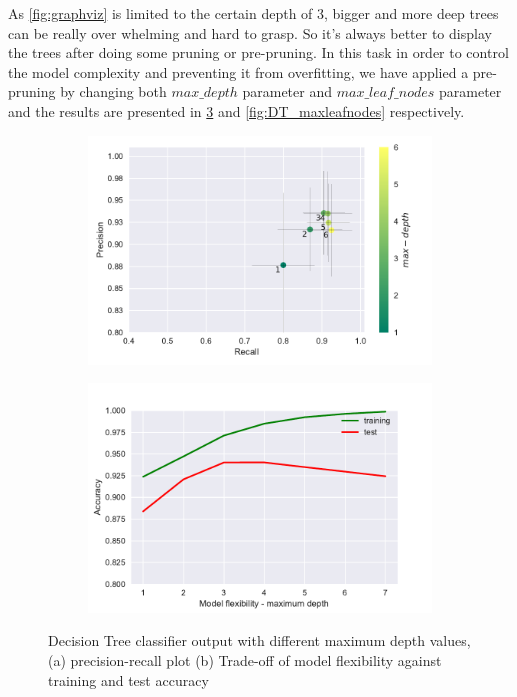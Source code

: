 \documentclass[12pt, a4paper]{scrartcl}
\begin{document}
As \cref{fig:graphviz} is limited to the certain depth of 3, bigger and more deep trees can be really over whelming and hard to grasp. So it's always better to display the trees after doing some pruning or pre-pruning. In this task in order to control the model complexity and preventing it from overfitting, we have applied a pre-pruning by changing both \emph{$max\_depth$} parameter and \emph{$max\_leaf\_nodes$} parameter and the results are presented in \cref{fig:DT_maxdepth} and \cref{fig:DT_maxleafnodes} respectively. 

\begin{figure}[h]
    \centering
    \begin{subfigure}{0.45\textwidth}
        \includegraphics[width=\textwidth]{prec_recall_dt_maxdepth}
        \caption{}
        \label{fig:prec_recall_dt_maxdepth}
    \end{subfigure}
    \begin{subfigure}{0.45\textwidth}
        \includegraphics[width=\textwidth]{tradeoff_dt_maxdepth}
        \caption{}
        \label{fig:tradeoff_dt_maxdepth}
    \end{subfigure}
    \caption{Decision Tree classifier output with different maximum depth values, (a) precision-recall plot (b) Trade-off of model flexibility against training and test accuracy}\label{fig:DT_maxdepth}
\end{figure}
\end{document}
